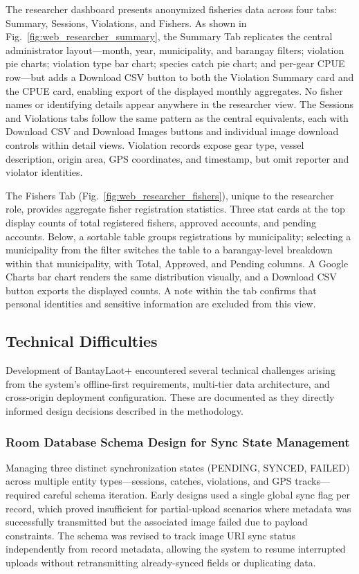 \documentclass{icsthesis}
\begin{document}
\begin{mainmatter}
The researcher dashboard presents anonymized fisheries data across four tabs: Summary,
Sessions, Violations, and Fishers. As shown in Fig.~\ref{fig:web_researcher_summary},
the Summary Tab replicates the central administrator layout---month, year, municipality,
and barangay filters; violation pie charts; violation type bar chart; species catch pie
chart; and per-gear CPUE row---but adds a Download CSV button to both the Violation
Summary card and the CPUE card, enabling export of the displayed monthly aggregates.
No fisher names or identifying details appear anywhere in the researcher view. The
Sessions and Violations tabs follow the same pattern as the central equivalents, each
with Download CSV and Download Images buttons and individual image download controls
within detail views. Violation records expose gear type, vessel description, origin
area, GPS coordinates, and timestamp, but omit reporter and violator identities.

The Fishers Tab (Fig.~\ref{fig:web_researcher_fishers}), unique to the researcher
role, provides aggregate fisher registration statistics. Three stat cards at the top
display counts of total registered fishers, approved accounts, and pending accounts.
Below, a sortable table groups registrations by municipality; selecting a municipality
from the filter switches the table to a barangay-level breakdown within that
municipality, with Total, Approved, and Pending columns. A Google Charts bar chart
renders the same distribution visually, and a Download CSV button exports the
displayed counts. A note within the tab confirms that personal identities and
sensitive information are excluded from this view.

\subsection{Technical Difficulties}

Development of BantayLaot+ encountered several technical challenges arising from the
system's offline-first requirements, multi-tier data architecture, and cross-origin
deployment configuration. These are documented as they directly informed design decisions
described in the methodology.

\subsubsection{Room Database Schema Design for Sync State Management}

Managing three distinct synchronization states (PENDING, SYNCED, FAILED) across multiple
entity types---sessions, catches, violations, and GPS tracks---required careful schema
iteration. Early designs used a single global sync flag per record, which proved
insufficient for partial-upload scenarios where metadata was successfully transmitted but
the associated image failed due to payload constraints. The schema was revised to track
image URI sync status independently from record metadata, allowing the system to resume
interrupted uploads without retransmitting already-synced fields or duplicating data.


\end{mainmatter}
\end{document}

